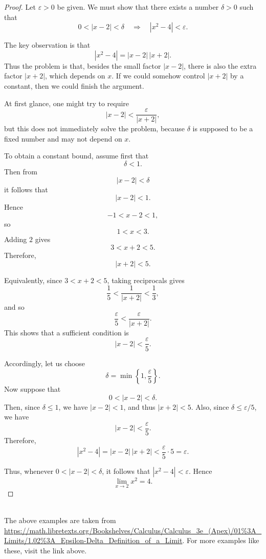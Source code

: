 \begin{proof}
Let $\varepsilon>0$ be given. We must show that there exists a number $\delta>0$
such that
\[
0<|x-2|<\delta
\quad\Longrightarrow\quad
|x^2-4|<\varepsilon.
\]

The key observation is that
\[
|x^2-4|=|x-2|\,|x+2|.
\]
Thus the problem is that, besides the small factor $|x-2|$, there is also the
extra factor $|x+2|$, which depends on $x$. If we could somehow control $|x+2|$
by a constant, then we could finish the argument.

At first glance, one might try to require
\[
|x-2|<\frac{\varepsilon}{|x+2|},
\]
but this does not immediately solve the problem, because $\delta$ is supposed to
be a fixed number and may not depend on $x$.

To obtain a constant bound, assume first that
\[
\delta<1.
\]
Then from
\[
|x-2|<\delta
\]
it follows that
\[
|x-2|<1.
\]
Hence
\[
-1<x-2<1,
\]
so
\[
1<x<3.
\]
Adding $2$ gives
\[
3<x+2<5.
\]
Therefore,
\[
|x+2|<5.
\]

Equivalently, since $3<x+2<5$, taking reciprocals gives
\[
\frac{1}{5}<\frac{1}{|x+2|}<\frac{1}{3},
\]
and so
\[
\frac{\varepsilon}{5}<\frac{\varepsilon}{|x+2|}.
\]
This shows that a sufficient condition is
\[
|x-2|<\frac{\varepsilon}{5}.
\]

Accordingly, let us choose
\[
\delta=\min\left\{1,\frac{\varepsilon}{5}\right\}.
\]
Now suppose that
\[
0<|x-2|<\delta.
\]
Then, since $\delta\le 1$, we have $|x-2|<1$, and thus $|x+2|<5$. Also, since
$\delta\le \varepsilon/5$, we have
\[
|x-2|<\frac{\varepsilon}{5}.
\]
Therefore,
\[
|x^2-4|
=|x-2|\,|x+2|
<\frac{\varepsilon}{5}\cdot 5
=\varepsilon.
\]

Thus, whenever $0<|x-2|<\delta$, it follows that $|x^2-4|<\varepsilon$. Hence
\[
\lim_{x\to 2}x^2=4.
\]
\end{proof}
~\\
The above examples are taken from 
\url{https://math.libretexts.org/Bookshelves/Calculus/Calculus_3e_(Apex)/01%3A_Limits/1.02%3A_Epsilon-Delta_Definition_of_a_Limit}. 
For more examples like these, visit the link above.   